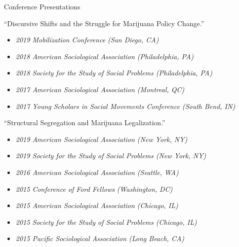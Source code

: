 \begin{rSection}{Conference Presentations}

``Discursive Shifts and the Struggle for Marijuana Policy Change.''
\vspace*{-.75em} 
\begin{itemize}[leftmargin=.25in]
\item {\footnotesize \it 2019 Mobilization Conference (San Diego, CA)}\vspace*{-.75em} 
\item {\footnotesize \it 2018 American Sociological Association (Philadelphia, PA)}\vspace*{-.75em} 
\item {\footnotesize \it 2018 Society for the Study of Social Problems (Philadelphia, PA)}\vspace*{-.75em} 
\item {\footnotesize \it 2017 American Sociological Association (Montreal, QC)}\vspace*{-.75em} 
\item {\footnotesize \it 2017 Young Scholars in Social Movements Conference (South Bend, IN)}
\end{itemize} 

``Structural Segregation and Marijuana Legalization.''
\vspace*{-.75em} 
\begin{itemize}[leftmargin=.25in] 
\item {\footnotesize \it 2019 American Sociological Association (New York, NY)}\vspace*{-.75em} 
\item {\footnotesize \it 2019 Society for the Study of Social Problems (New York, NY)}\vspace*{-.75em} 
\item {\footnotesize \it 2016 American Sociological Association (Seattle, WA)}\vspace*{-.75em} 
\item {\footnotesize \it 2015 Conference of Ford Fellows (Washington, DC)}\vspace*{-.75em} 
\item {\footnotesize \it 2015 American Sociological Association (Chicago, IL)}\vspace*{-.75em} 
\item {\footnotesize \it 2015 Society for the Study of Social Problems (Chicago, IL)}\vspace*{-.75em} 
\item {\footnotesize \it 2015 Pacific Sociological Association (Long Beach, CA)}
\end{itemize} 


\end{rSection}
